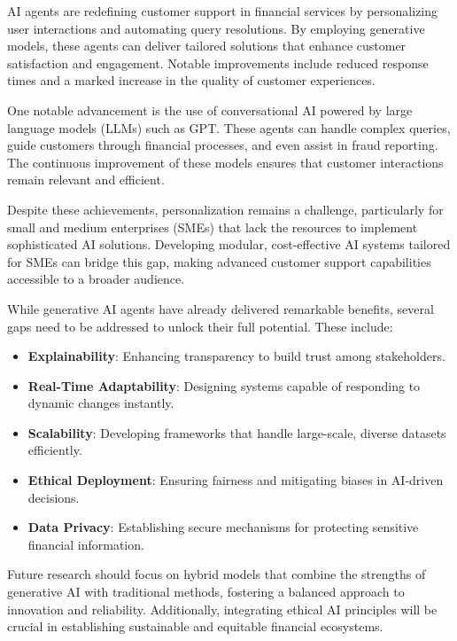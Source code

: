 \documentclass[a4paper,12pt]{scrbook}
\begin{document}
	
	AI agents are redefining customer support in financial services by personalizing user interactions and automating query resolutions. By employing generative models, these agents can deliver tailored solutions that enhance customer satisfaction and engagement. Notable improvements include reduced response times and a marked increase in the quality of customer experiences.
	
	One notable advancement is the use of conversational AI powered by large language models (LLMs) such as GPT. These agents can handle complex queries, guide customers through financial processes, and even assist in fraud reporting. The continuous improvement of these models ensures that customer interactions remain relevant and efficient.
	
	Despite these achievements, personalization remains a challenge, particularly for small and medium enterprises (SMEs) that lack the resources to implement sophisticated AI solutions. Developing modular, cost-effective AI systems tailored for SMEs can bridge this gap, making advanced customer support capabilities accessible to a broader audience.
	
	
	While generative AI agents have already delivered remarkable benefits, several gaps need to be addressed to unlock their full potential. These include:
	
	\begin{itemize}
		\item \textbf{Explainability}: Enhancing transparency to build trust among stakeholders.
		\item \textbf{Real-Time Adaptability}: Designing systems capable of responding to dynamic changes instantly.
		\item \textbf{Scalability}: Developing frameworks that handle large-scale, diverse datasets efficiently.
		\item \textbf{Ethical Deployment}: Ensuring fairness and mitigating biases in AI-driven decisions.
		\item \textbf{Data Privacy}: Establishing secure mechanisms for protecting sensitive financial information.
	\end{itemize}
	
	Future research should focus on hybrid models that combine the strengths of generative AI with traditional methods, fostering a balanced approach to innovation and reliability. Additionally, integrating ethical AI principles will be crucial in establishing sustainable and equitable financial ecosystems.
	
\end{document}
